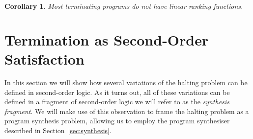 \documentclass[preprint]{sigplanconf}
\newtheorem{corollary}[theorem]{Corollary}
\theoremstyle{definition}
\begin{document}
\begin{corollary}
 Most terminating programs do not have linear ranking functions.
\end{corollary}
\fi


\section{Termination as Second-Order Satisfaction}
In this section we will show how several variations of the halting problem can be defined in second-order
logic.  As it turns out, all of these variations can be defined in a fragment of second-order logic
we will refer to as the \emph{synthesis fragment}.  We will make use of this observation to frame the halting
problem as a program synthesis problem, allowing us to employ the program synthesiser described in
Section~\ref{sec:synthesis}.
\end{document}
